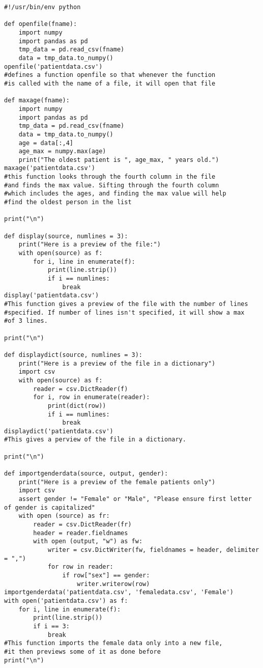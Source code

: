 \documentclass{article}
\begin{document}
\begin{verbatim}
#!/usr/bin/env python

def openfile(fname):
    import numpy
    import pandas as pd
    tmp_data = pd.read_csv(fname)
    data = tmp_data.to_numpy()
openfile('patientdata.csv')
#defines a function openfile so that whenever the function
#is called with the name of a file, it will open that file

def maxage(fname):
    import numpy
    import pandas as pd
    tmp_data = pd.read_csv(fname)
    data = tmp_data.to_numpy()
    age = data[:,4]
    age_max = numpy.max(age)
    print("The oldest patient is ", age_max, " years old.")
maxage('patientdata.csv')
#this function looks through the fourth column in the file
#and finds the max value. Sifting through the fourth column
#which includes the ages, and finding the max value will help
#find the oldest person in the list

print("\n")

def display(source, numlines = 3):
    print("Here is a preview of the file:")
    with open(source) as f:
        for i, line in enumerate(f):
            print(line.strip())
            if i == numlines:
                break
display('patientdata.csv')
#This function gives a preview of the file with the number of lines
#specified. If number of lines isn't specified, it will show a max
#of 3 lines.

print("\n")

def displaydict(source, numlines = 3):
    print("Here is a preview of the file in a dictionary")
    import csv
    with open(source) as f:
        reader = csv.DictReader(f)
        for i, row in enumerate(reader):
            print(dict(row))
            if i == numlines:
                break
displaydict('patientdata.csv')
#This gives a perview of the file in a dictionary.

print("\n")

def importgenderdata(source, output, gender):
    print("Here is a preview of the female patients only")
    import csv
    assert gender != "Female" or "Male", "Please ensure first letter of gender is capitalized"
    with open (source) as fr:
        reader = csv.DictReader(fr)
        header = reader.fieldnames
        with open (output, "w") as fw:
            writer = csv.DictWriter(fw, fieldnames = header, delimiter = ",")
            for row in reader:
                if row["sex"] == gender:
                    writer.writerow(row)
importgenderdata('patientdata.csv', 'femaledata.csv', 'Female')
with open('patientdata.csv') as f:
    for i, line in enumerate(f):
        print(line.strip())
        if i == 3:
            break
#This function imports the female data only into a new file,
#it then previews some of it as done before
print("\n")


\end{verbatim}
\end{document}
